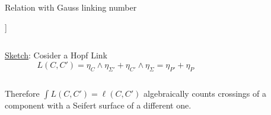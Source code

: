 \documentclass[handout,10pt]{beamer}
\begin{document}
\begin{frame}{Relation with Gauss linking number}
\begin{propblock}
		]
	\pause
  	\begin{columns}
		\begin{column}[c]{.7\linewidth}	
		\underline{Sketch}: Cosider a Hopf Link
			\begin{displaymath}
				L(C,C') = \eta_C \wedge \eta_{\Sigma'} + \eta_{C'} \wedge \eta_\Sigma =
				\eta_{P'} + \eta_{P}
			\end{displaymath}
		\end{column}
		\begin{column}[c]{.25\linewidth}	
		\end{column}
  	\end{columns}
			Therefore $\int L(C,C') = \ell(C,C')$ 
			algebraically counts crossings of a component with a Seifert surface of a different one.			%
		\end{propblock}
		
\end{frame}
\end{document}
